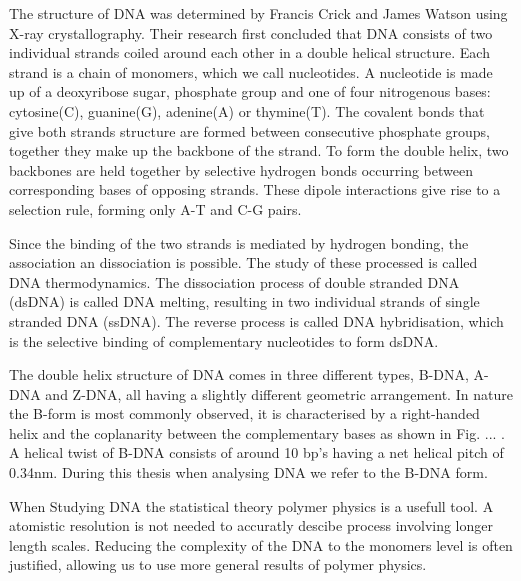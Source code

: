 The structure of DNA was determined by Francis Crick and James Watson using X-ray
crystallography. Their research first concluded that DNA consists of two individual
strands coiled around each other in a double helical structure. Each strand
is a chain of monomers, which we call nucleotides. A nucleotide is made up of a
deoxyribose sugar, phosphate group and one of four nitrogenous bases: cytosine(C),
guanine(G), adenine(A) or thymine(T). The covalent bonds that give both strands structure
are formed between consecutive phosphate groups, together they make up the backbone of
the strand. To form the double helix, two backbones are held together by
selective hydrogen bonds occurring between corresponding bases of opposing strands. These
dipole interactions give rise to a selection rule, forming only A-T and C-G pairs.

Since the binding of the two strands is mediated by hydrogen bonding, the association an
dissociation is possible. The study of these processed is called DNA thermodynamics. The
dissociation process of double stranded DNA (dsDNA) is called DNA melting, resulting in
two individual strands of single stranded DNA (ssDNA). The reverse process is called DNA
hybridisation, which is the selective binding of complementary nucleotides to form dsDNA.

The double helix structure of DNA comes in three different types, B-DNA, A-DNA and Z-DNA,
all having a slightly different geometric arrangement. In nature the B-form is most
commonly observed, it is characterised by a right-handed helix and the coplanarity
between the complementary bases as shown in Fig. ... . A helical twist of B-DNA consists
of around 10 bp's having a net helical pitch of 0.34nm. During this thesis when analysing
DNA we refer to the B-DNA form.

When Studying DNA the statistical theory polymer physics is a usefull tool. A atomistic
resolution is not needed to accuratly descibe process involving longer length scales.
Reducing the complexity of the DNA to the monomers level is often justified, allowing us
to use more general results of polymer physics.


